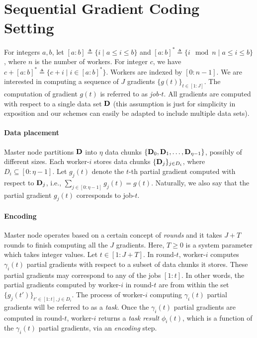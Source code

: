\section{Sequential Gradient Coding Setting}\label{ch2:sec:setting}

For integers $a,b$, let $[a:b]\triangleq \{i\mid a\leq i\leq b\}$ and $[a:b]^*\triangleq \{i \mod n\mid a\leq i\leq b\}$, where $n$ is the number of workers. For integer $c$, we have $c+[a:b]^*\triangleq \{c+i\mid i\in[a:b]^*\}$. Workers are indexed by $[0:n-1]$. We are interested in computing a sequence of $J$ gradients $\{g(t)\}_{t\in[1:J]}$. The computation of gradient $g(t)$ is referred to as \textit{job-$t$}. All gradients are computed with respect to a single data set $\mathbf{D}$ (this assumption is just for simplicity in exposition and our schemes can easily be adapted to include multiple data sets). 

\paragraph{Data placement} Master node partitions $\mathbf{D}$ into $\eta$ data chunks $\{\mathbf{D}_0,\mathbf{D}_1,\ldots,\mathbf{D}_{\eta-1}\}$, possibly of different sizes. Each worker-$i$ stores data chunks $\{\mathbf{D}_j\}_{j\in{D}_i}$, where ${D}_i\subseteq[0:\eta-1]$. Let $g_{j}(t)$ denote the $t$-th partial gradient computed with respect to $\mathbf{D}_{j}$, i.e., $\sum_{j\in[0:\eta-1]}g_{j}(t)=g(t)$. Naturally, we also say that the partial gradient $g_{j}(t)$ corresponds to job-$t$.

\paragraph{Encoding} Master node operates based on a certain concept of \textit{rounds} and it takes $J+T$ rounds to finish computing all the $J$ gradients. Here, $T\geq0$ is a system parameter which takes integer values.  Let $t\in[1:J+T]$. In round-$t$, worker-$i$ computes $\gamma_i(t)$  partial gradients with respect to a subset of data chunks it stores. These partial gradients may correspond to any of the jobs $[1:t]$. In other words, the partial gradients computed by worker-$i$ in round-$t$ are from within the set $\{g_{j}(t')\}_{t'\in[1:t],j\in{D}_i}$. The process of worker-$i$ computing $\gamma_i(t)$ partial gradients will be referred to as a \textit{task}. Once the $\gamma_i(t)$ partial gradients are computed in round-$t$, worker-$i$ returns a \textit{task result} $\phi_i(t)$, which is a function of the $\gamma_i(t)$ partial gradients, via an \textit{encoding} step. %

